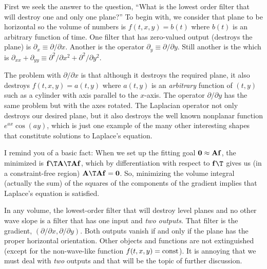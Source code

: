 \par\noindent
{}

\par
First we seek the answer to the question,
``What is the lowest order filter that will destroy
one and only one plane?''
To begin with, we consider that plane to be horizontal
so the volume of numbers is
$f(t,x,y) = b(t)$
where $b(t)$ is an arbitrary function of time.
One filter that has zero-valued output (destroys the plane)
is 
$\partial_x \equiv \partial / \partial x$.
Another is the operator
$\partial_y \equiv \partial / \partial y$.
Still another is the  which is
$\partial_{xx}+\partial_{yy}\equiv\partial^2/\partial x^2+\partial^2/\partial y^2$.

\par
The problem with $\partial / \partial x$ is that
although it destroys the required plane,
it also destroys
$f(t,x,y) = a(t,y)$ where $a(t,y)$ is an {\it arbitrary} function of $(t,y)$
such as a cylinder with axis parallel to the $x$-axis.
The operator $\partial / \partial y$ has the same problem
but with the axes rotated.
The Laplacian operator not only destroys our desired plane,
but it also destroys the well known nonplanar function
$e^{ax}\cos(ay)$,
which is just one example of the many other interesting shapes
that constitute solutions to Laplace's equation.
\par
I remind you of a basic fact:
When we set up the fitting goal $\bold 0\approx \bold A \bold f$,
the  minimized is $\bold f\T\bold A\T \bold A \bold f$,
which by differentiation with respect to $\bold f\T$
gives us (in a constraint-free region) $\bold A\T\bold A\bold f = \bold 0$.
So, minimizing the volume integral (actually the sum)
of the squares of the components of the gradient
implies that Laplace's equation is satisfied.

\par
In any volume,
the lowest-order filter
that will destroy level planes and no other wave slope
is a filter that has one input and {\it two outputs}.
That filter is the gradient,
$(\partial / \partial x, \partial / \partial y)$.
Both outputs vanish if and only if
the plane has the proper horizontal orientation.
Other objects and functions are not extinguished
(except for the non-wave-like function $f(t,x,y)= {\rm const}$).
It is annoying that we must deal with {\it two} outputs
and that will be the topic of further discussion.

